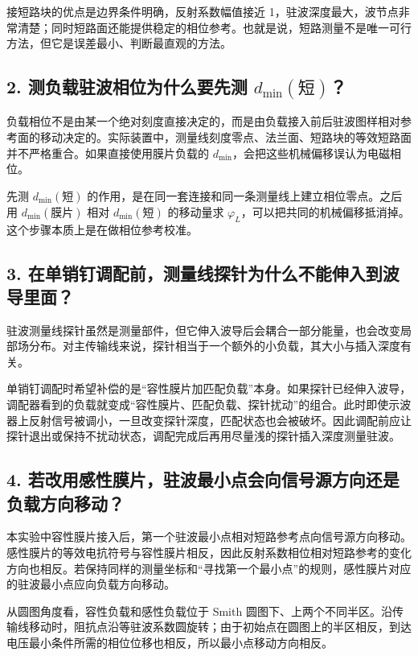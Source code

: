 \documentclass[UTF8]{ctexart}
\begin{document}
接短路块的优点是边界条件明确，反射系数幅值接近 1，驻波深度最大，波节点非常清楚；同时短路面还能提供稳定的相位参考。也就是说，短路测量不是唯一可行方法，但它是误差最小、判断最直观的方法。

\subsection*{2. 测负载驻波相位为什么要先测 $d_{\min}(\text{短})$？}

负载相位不是由某一个绝对刻度直接决定的，而是由负载接入前后驻波图样相对参考面的移动决定的。实际装置中，测量线刻度零点、法兰面、短路块的等效短路面并不严格重合。如果直接使用膜片负载的 $d_{\min}$，会把这些机械偏移误认为电磁相位。

先测 $d_{\min}(\text{短})$ 的作用，是在同一套连接和同一条测量线上建立相位零点。之后用 $d_{\min}(\text{膜片})$ 相对 $d_{\min}(\text{短})$ 的移动量求 $\varphi_L$，可以把共同的机械偏移抵消掉。这个步骤本质上是在做相位参考校准。

\subsection*{3. 在单销钉调配前，测量线探针为什么不能伸入到波导里面？}

驻波测量线探针虽然是测量部件，但它伸入波导后会耦合一部分能量，也会改变局部场分布。对主传输线来说，探针相当于一个额外的小负载，其大小与插入深度有关。

单销钉调配时希望补偿的是“容性膜片加匹配负载”本身。如果探针已经伸入波导，调配器看到的负载就变成“容性膜片、匹配负载、探针扰动”的组合。此时即使示波器上反射信号被调小，一旦改变探针深度，匹配状态也会被破坏。因此调配前应让探针退出或保持不扰动状态，调配完成后再用尽量浅的探针插入深度测量驻波。

\subsection*{4. 若改用感性膜片，驻波最小点会向信号源方向还是负载方向移动？}

本实验中容性膜片接入后，第一个驻波最小点相对短路参考点向信号源方向移动。感性膜片的等效电抗符号与容性膜片相反，因此反射系数相位相对短路参考的变化方向也相反。若保持同样的测量坐标和“寻找第一个最小点”的规则，感性膜片对应的驻波最小点应向负载方向移动。

从圆图角度看，容性负载和感性负载位于 Smith 圆图下、上两个不同半区。沿传输线移动时，阻抗点沿等驻波系数圆旋转；由于初始点在圆图上的半区相反，到达电压最小条件所需的相位位移也相反，所以最小点移动方向相反。
\end{document}
